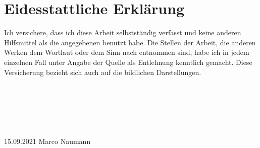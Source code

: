 \documentclass{TUBAFarbeiten}
\begin{document}
\newpage





\newpage
\section{Eidesstattliche Erklärung}
Ich versichere, dass ich diese Arbeit selbstständig verfasst und keine anderen Hilfsmittel als
die angegebenen benutzt habe. Die Stellen der Arbeit, die anderen Werken dem Wortlaut oder
dem Sinn nach entnommen sind, habe ich in jedem einzelnen Fall unter Angabe der Quelle
als Entlehnung kenntlich gemacht. Diese Versicherung bezieht sich auch auf die bildlichen
Darstellungen.\\ \\ \\ \\ \\ \\ \\
15.09.2021 \hfill Marco Naumann
\end{document}
